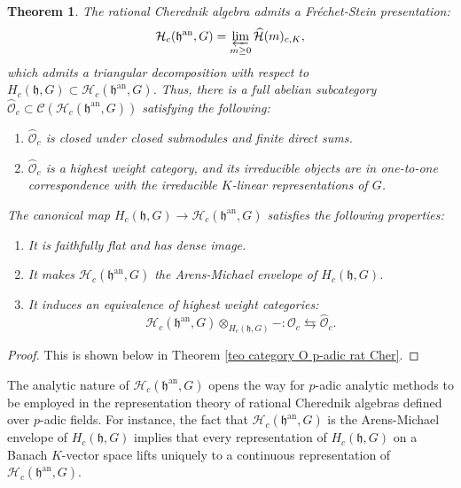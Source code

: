 \documentclass{amsart}
\newtheorem{intteo}{Theorem}
\newcommand{\OX}{\mathcal{O}}
\begin{document}
\begin{intteo}
 The rational Cherednik algebra admits a Fréchet-Stein presentation:
\begin{equation*}
    \mathcal{H}_c(\mathfrak{h}^{\operatorname{an}},G)=\varprojlim_{m\geq 0}\widehat{\mathcal{H}}(m)_{c,K},
\end{equation*}
which admits a triangular decomposition with respect to $H_c(\mathfrak{h},G)\subset \mathcal{H}_c(\mathfrak{h}^{\operatorname{an}},G)$.
Thus, there is a full abelian subcategory $\wideparen{\OX}_c\subset \mathcal{C}(\mathcal{H}_c(\mathfrak{h}^{\operatorname{an}},G))$  satisfying the following:
\begin{enumerate}[label=(\roman*)]
    \item $\wideparen{\OX}_c$ is closed under closed submodules and finite direct sums.
    \item $\wideparen{\OX}_c$ is a highest weight category, and   its irreducible objects are in one-to-one correspondence with the irreducible $K$-linear representations of $G$.
\end{enumerate}
The canonical map $H_c(\mathfrak{h},G)\rightarrow \mathcal{H}_c(\mathfrak{h}^{\operatorname{an}},G)$ satisfies the following properties:
\begin{enumerate}[label=(\roman*)]
    \item It is faithfully flat and has dense image.
    \item It makes $\mathcal{H}_c(\mathfrak{h}^{\operatorname{an}},G)$ the Arens-Michael envelope of $H_c(\mathfrak{h},G)$.
    \item It induces an equivalence of highest weight categories:
    \begin{equation*}
        \mathcal{H}_c(\mathfrak{h}^{\operatorname{an}},G)\otimes_{H_c(\mathfrak{h},G)}-:\OX_c\leftrightarrows \wideparen{\OX}_c.
    \end{equation*}
\end{enumerate}     
\end{intteo}
\begin{proof}
This is shown below in Theorem \ref{teo category O p-adic rat Cher}.
\end{proof}
The analytic nature of $\mathcal{H}_c(\mathfrak{h}^{\operatorname{an}},G)$ opens the way for $p$-adic analytic methods to be employed in the representation theory of rational Cherednik algebras defined over $p$-adic fields. For instance, the fact that $\mathcal{H}_c(\mathfrak{h}^{\operatorname{an}},G)$ is the Arens-Michael envelope of $H_c(\mathfrak{h},G)$ implies that every representation of $H_c(\mathfrak{h},G)$ on a Banach $K$-vector space lifts uniquely to a continuous representation of $\mathcal{H}_c(\mathfrak{h}^{\operatorname{an}},G)$.\bigskip
\end{document}
